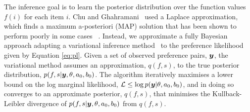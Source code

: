 The inference goal is to learn the posterior distribution over the function values $f(i)$ for each item $i$.
Chu and Ghahramani~
used a Laplace approximation, which finds a maximum a-posteriori (MAP) solution
that has been shown to perform poorly in some cases
~\cite{nickisch2008approximations}. 
Instead, we approximate a fully Bayesian approach
adapting a variational inference method~\cite{reece2011determining,steinberg2014extended} 
to the preference likelihood given by Equation \ref{eq:pl}.
Given a set of observed preference pairs, $\boldsymbol y$,
the variational method assumes an approximation, $q(f,s)$,
 to the true posterior distribution, 
$p(f,s|\boldsymbol y, \theta, a_0, b_0)$.
The algorithm iteratively maximises a lower bound on the log marginal likelihood, 
$\mathcal{L} \leq \log p(\boldsymbol y | \theta, a_0, b_0)$,
and in doing so converges to an approximate posterior, $q(f,s)$,
that minimises the Kullback-Leibler divergence of $p(f,s|\boldsymbol y, \theta, a_0, b_0)$ from $q(f,s)$. 

